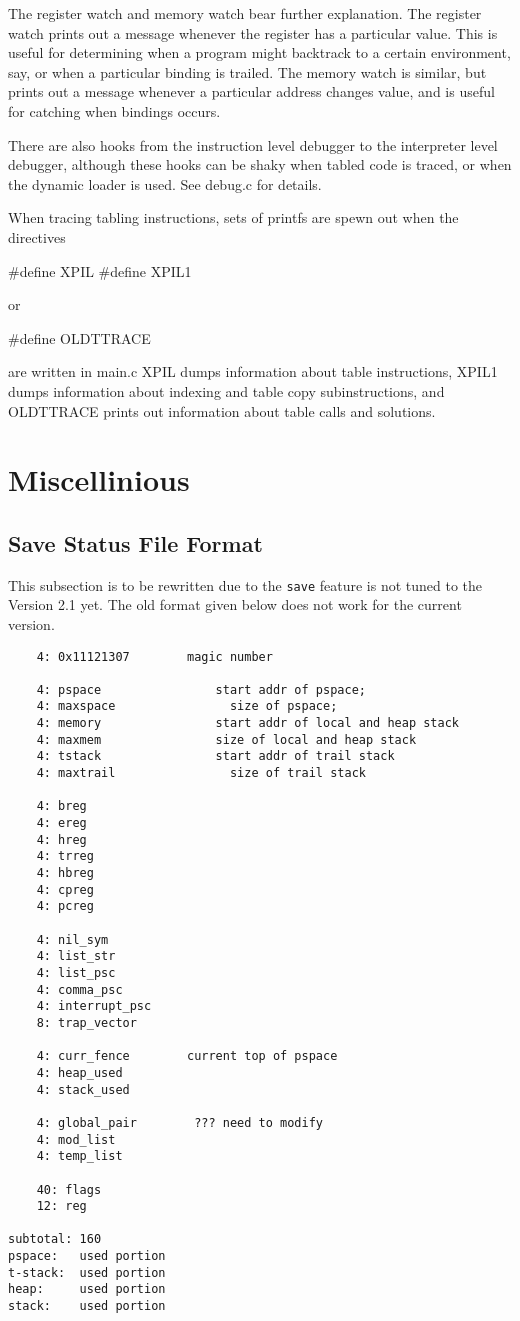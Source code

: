 \documentclass[11pt]{article}
\newcommand{\version}{Version 2.1}
\begin{document}
The register watch and memory watch bear further explanation.  The
register watch prints out a message whenever the register has a
particular value.  This is useful for determining when a program
might backtrack to a certain environment, say, or when a particular
binding is trailed.  The memory watch is similar, but prints out a
message whenever a particular address changes value, and is useful for
catching when bindings occurs.

There are also hooks from the instruction level debugger to the
interpreter level debugger, although these hooks can be shaky when
tabled code is traced, or when the dynamic loader is used.  See
debug.c for details.

When tracing tabling instructions, sets of printfs are spewn out when
the directives
\begin{center}
\#define XPIL
\#define XPIL1
\end{center}
or
\begin{center}
\#define OLDTTRACE
\end{center}
are written in main.c  XPIL dumps information about table
instructions, XPIL1 dumps information about indexing and table copy
subinstructions, and OLDTTRACE prints out information about table
calls and solutions.

\section                 {Miscellinious}

\subsection{Save Status File Format}

This subsection is to be rewritten due to the {\tt save} feature
is not tuned to the \version \mbox{} yet. The old format given below does
not work for the current version.

\begin{verbatim}
    4: 0x11121307        magic number

    4: pspace                start addr of pspace;
    4: maxspace                size of pspace;
    4: memory                start addr of local and heap stack
    4: maxmem                size of local and heap stack
    4: tstack                start addr of trail stack
    4: maxtrail                size of trail stack

    4: breg
    4: ereg
    4: hreg
    4: trreg
    4: hbreg
    4: cpreg
    4: pcreg

    4: nil_sym
    4: list_str
    4: list_psc
    4: comma_psc
    4: interrupt_psc
    8: trap_vector

    4: curr_fence        current top of pspace
    4: heap_used
    4: stack_used

    4: global_pair        ??? need to modify
    4: mod_list
    4: temp_list

    40: flags
    12: reg

subtotal: 160
pspace:   used portion
t-stack:  used portion
heap:     used portion
stack:    used portion
\end{verbatim}
\end{document}
